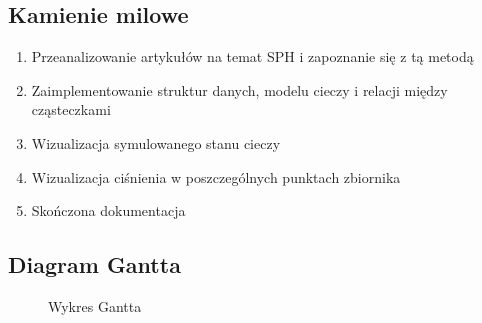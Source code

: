 \documentclass[a4paper]{article}
\begin{document}
\subsection{Kamienie milowe}
\begin{enumerate}[label=K\arabic*{.}]
  \item Przeanalizowanie artykułów na temat SPH i zapoznanie się z tą metodą
  \item Zaimplementowanie struktur danych, modelu cieczy i relacji między cząsteczkami
  \item Wizualizacja symulowanego stanu cieczy
  \item Wizualizacja ciśnienia w poszczególnych punktach zbiornika
  \item Skończona dokumentacja
\end{enumerate}

\subsection{Diagram Gantta}
\begin{figure}[h] %
  \begin{center}  %
  \end{center}
  \caption{Wykres Gantta}
  \label{fig:gantt} %
\end{figure}       %
\end{document}
